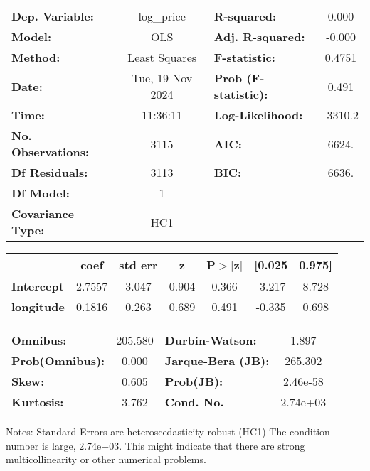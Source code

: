 \begin{center}
\begin{tabular}{lclc}
\toprule
\textbf{Dep. Variable:}    &    log\_price    & \textbf{  R-squared:         } &     0.000   \\
\textbf{Model:}            &       OLS        & \textbf{  Adj. R-squared:    } &    -0.000   \\
\textbf{Method:}           &  Least Squares   & \textbf{  F-statistic:       } &    0.4751   \\
\textbf{Date:}             & Tue, 19 Nov 2024 & \textbf{  Prob (F-statistic):} &    0.491    \\
\textbf{Time:}             &     11:36:11     & \textbf{  Log-Likelihood:    } &   -3310.2   \\
\textbf{No. Observations:} &        3115      & \textbf{  AIC:               } &     6624.   \\
\textbf{Df Residuals:}     &        3113      & \textbf{  BIC:               } &     6636.   \\
\textbf{Df Model:}         &           1      & \textbf{                     } &             \\
\textbf{Covariance Type:}  &       HC1        & \textbf{                     } &             \\
\bottomrule
\end{tabular}
\begin{tabular}{lcccccc}
                   & \textbf{coef} & \textbf{std err} & \textbf{z} & \textbf{P$> |$z$|$} & \textbf{[0.025} & \textbf{0.975]}  \\
\midrule
\textbf{Intercept} &       2.7557  &        3.047     &     0.904  &         0.366        &       -3.217    &        8.728     \\
\textbf{longitude} &       0.1816  &        0.263     &     0.689  &         0.491        &       -0.335    &        0.698     \\
\bottomrule
\end{tabular}
\begin{tabular}{lclc}
\textbf{Omnibus:}       & 205.580 & \textbf{  Durbin-Watson:     } &    1.897  \\
\textbf{Prob(Omnibus):} &   0.000 & \textbf{  Jarque-Bera (JB):  } &  265.302  \\
\textbf{Skew:}          &   0.605 & \textbf{  Prob(JB):          } & 2.46e-58  \\
\textbf{Kurtosis:}      &   3.762 & \textbf{  Cond. No.          } & 2.74e+03  \\
\bottomrule
\end{tabular}
\end{center}

Notes: \newline
 [1] Standard Errors are heteroscedasticity robust (HC1) \newline
 [2] The condition number is large, 2.74e+03. This might indicate that there are \newline
 strong multicollinearity or other numerical problems.